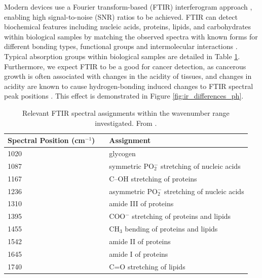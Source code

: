 \noindent
Modern devices use a Fourier transform-based (FTIR) interferogram approach \cite{griffiths_fourier_1983}, enabling high signal-to-noise (SNR) ratios to be achieved. FTIR can detect biochemical features including nucleic acids, proteins, lipids, and carbohydrates within biological samples by matching the observed spectra with known forms for different bonding types, functional groups and intermolecular interactions \cite{su_fourier_2020}. Typical absorption groups within biological samples are detailed in Table \ref{table:functional_groups}. Furthermore, we expect FTIR to be a good for cancer detection, as cancerous growth is often associated with changes in the acidity of tissues, and changes in acidity are known to cause hydrogen-bonding induced changes to FTIR spectral peak positions \cite{wolpert_infrared_2006,torii_modeling_2024,czowski_cancer_2020}. This effect is demonstrated in Figure \ref{fig:ir_differences_ph}.

\begin{table}[htbp]
  \centering
  \begin{tabular}{@{}lc@{\hspace{1cm}}l@{}}
    \toprule
    \textbf{Spectral Position (cm$^{-1}$)} & & \textbf{Assignment} \\ 
    \midrule
    1020 & & glycogen \\
    1087 & & symmetric PO$_2^-$ stretching of nucleic acids \\
    1167 & & C–OH stretching of proteins \\
    1236 & & asymmetric PO$_2^-$ stretching of nucleic acids \\
    1310 & & amide III of proteins \\
    1395 & & COO$^-$ stretching of proteins and lipids \\
    1455 & & CH$_3$ bending of proteins and lipids \\
    1542 & & amide II of proteins \\
    1645 & & amide I of proteins \\
    1740 & & C=O stretching of lipids \\
    \bottomrule
  \end{tabular}
  \label{table:functional_groups}
  \caption{Relevant FTIR spectral assignments within the wavenumber range investigated. From \cite{lasalvia_discrimination_2023, talari_advances_2017}.}
\end{table}

